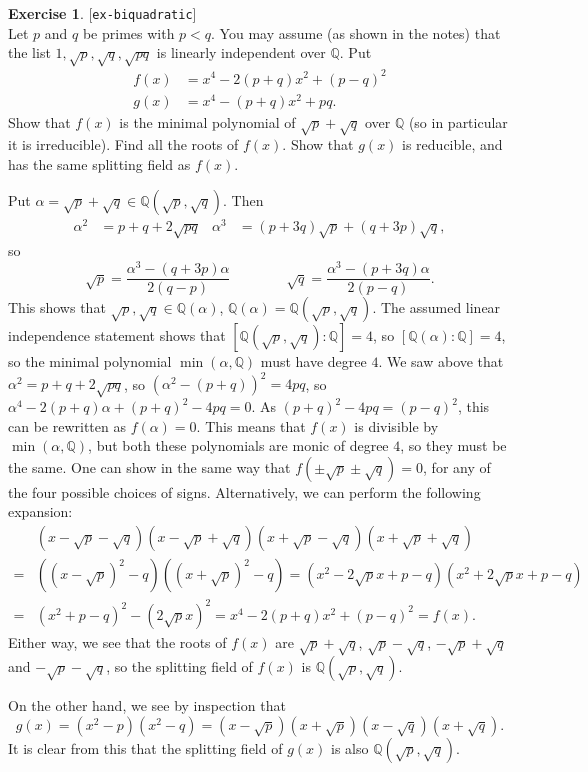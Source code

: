 \documentclass{amsart}
\newcommand{\Q}         {{\mathbb{Q}}}
\newcommand{\al}        {\alpha}
\renewcommand{\:}{\colon}
\newcommand{\lastexlabel}{}
\newcommand{\exlabel}[1]{
 \global\def\lastexlabel{#1}\label{#1}[\texttt{#1}]\ \\
}
\newcommand{\exlabel}[1]{
 \global\def\lastexlabel{#1}\label{#1}
}
\newenvironment{solution}{\SolutionInline}{\endSolutionInline}
\theoremstyle{definition}
\newtheorem{exercise}{Exercise}[section]
\renewenvironment{solution}{\SolutionAtEnd}{\endSolutionAtEnd}
\begin{document}
\begin{exercise}\exlabel{ex-biquadratic}
 Let $p$ and $q$ be primes with $p<q$.  You may assume (as shown in
 the notes) that the list $1,\sqrt{p},\sqrt{q},\sqrt{pq}$ is linearly
 independent over $\Q$.  Put 
 \begin{align*}
  f(x) &= x^4 - 2(p+q)x^2 + (p-q)^2 \\
  g(x) &= x^4 - (p+q)x^2 + pq.
 \end{align*}
 Show that $f(x)$ is the minimal polynomial of $\sqrt{p}+\sqrt{q}$
 over $\Q$ (so in particular it is irreducible).  Find all the roots
 of $f(x)$.  Show that $g(x)$ is reducible, and has the same splitting
 field as $f(x)$.
\end{exercise}
\begin{solution}
 Put $\al=\sqrt{p}+\sqrt{q}\in\Q(\sqrt{p},\sqrt{q})$.  Then 
 \begin{align*}
  \al^2    &= p+q+2\sqrt{pq} &
  \al^3    &= (p+3q)\sqrt{p}+(q+3p)\sqrt{q}, 
 \end{align*}
 so 
 \[ \sqrt{p} = \frac{\al^3-(q+3p)\al}{2(q-p)}
    \hspace{4em}
    \sqrt{q} = \frac{\al^3-(p+3q)\al}{2(p-q)}.
 \]
 This shows that $\sqrt{p},\sqrt{q}\in\Q(\al)$,
 $\Q(\al)=\Q(\sqrt{p},\sqrt{q})$.  The assumed linear independence
 statement shows that $[\Q(\sqrt{p},\sqrt{q}):\Q]=4$, so
 $[\Q(\al):\Q]=4$, so the minimal polynomial $\min(\al,\Q)$ must have
 degree $4$.  We saw above that $\al^2=p+q+2\sqrt{pq}$, so
 $(\al^2-(p+q))^2=4pq$, so $\al^4-2(p+q)\al+(p+q)^2-4pq=0$.  As
 $(p+q)^2-4pq=(p-q)^2$, this can be rewritten as $f(\al)=0$.  This
 means that $f(x)$ is divisible by $\min(\al,\Q)$, but both these
 polynomials are monic of degree $4$, so they must be the same.
 One can show in the same way that $f(\pm\sqrt{p}\pm\sqrt{q})=0$, for
 any of the four possible choices of signs.  Alternatively, we can
 perform the following expansion:
 \begin{align*}
   & (x-\sqrt{p}-\sqrt{q}) 
     (x-\sqrt{p}+\sqrt{q}) 
     (x+\sqrt{p}-\sqrt{q}) 
     (x+\sqrt{p}+\sqrt{q}) \\
  =& ((x-\sqrt{p})^2-q)((x+\sqrt{p})^2-q) = 
     (x^2-2\sqrt{p}x+p-q)(x^2+2\sqrt{p}x+p-q) \\
  =& (x^2+p-q)^2 - (2\sqrt{p}x)^2 
      = x^4 - 2(p+q)x^2 + (p-q)^2 = f(x).
 \end{align*}
 Either way, we see that the roots of $f(x)$ are $\sqrt{p}+\sqrt{q}$,
 $\sqrt{p}-\sqrt{q}$, $-\sqrt{p}+\sqrt{q}$ and $-\sqrt{p}-\sqrt{q}$,
 so the splitting field of $f(x)$ is $\Q(\sqrt{p},\sqrt{q})$.  

 On the other hand, we see by inspection that 
 \[ g(x)=(x^2-p)(x^2-q)=
     (x-\sqrt{p})(x+\sqrt{p})(x-\sqrt{q})(x+\sqrt{q}).
 \]
 It is clear from this that the splitting field of $g(x)$ is also
 $\Q(\sqrt{p},\sqrt{q})$. 
\end{solution}
\end{document}
